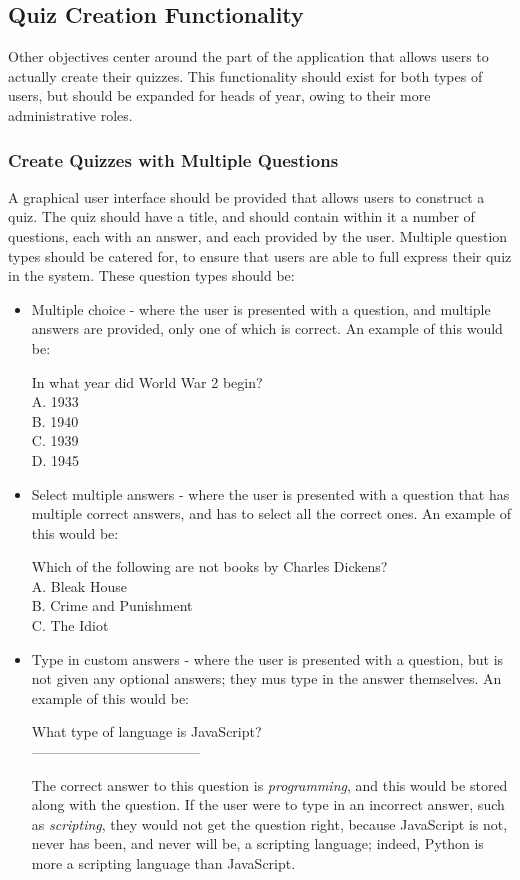 \subsection{Quiz Creation Functionality}
Other objectives center around the part of the application that allows users to actually create their quizzes. This functionality should exist for both types of users, but should be expanded for heads of year, owing to their more administrative roles.

\subsubsection{Create Quizzes with Multiple Questions} 
A graphical user interface should be provided that allows users to construct a quiz. The quiz should have a title, and should contain within it a number of questions, each with an answer, and each provided by the user. Multiple question types should be catered for, to ensure that users are able to full express their quiz in the system. These question types should be:\\

\begin{itemize}
\item Multiple choice - where the user is presented with a question, and multiple answers are provided, only one of which is correct. An example of this would be:

In what year did World War 2 begin?\\
A. 1933\\
B. 1940\\
C. 1939\\
D. 1945

\item Select multiple answers - where the user is presented with a question that has multiple correct answers, and has to select all the correct ones. An example of this would be:

Which of the following are not books by Charles Dickens?\\
A. Bleak House\\
B. Crime and Punishment\\
C. The Idiot

\item Type in custom answers - where the user is presented with a question, but is not given any optional answers; they mus type in the answer themselves. An example of this would be:

What type of language is JavaScript?\\

------------------------------------

The correct answer to this question is \textit{programming}, and this would be stored along with the question. If the user were to type in an incorrect answer, such as \textit{scripting}, they would not get the question right, because JavaScript is not, never has been, and never will be, a scripting language; indeed, Python is more a scripting language than JavaScript.\\
\end{itemize}

